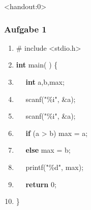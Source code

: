 \documentclass[aspectratio=1610,onlymath, ngerman]{beamer}
\renewcommand{\emph}[1]{\textbf{#1}}
\begin{document}
	\begin{frame}<handout:0> \frametitle{Aufgabe 1}
	\small
		\begin{minipage}{\dimexpr0.5\linewidth-\fboxrule-\fboxsep}
			\begin{ttfamily}
				\begin{enumerate}[label=\arabic* $\enskip$, nolistsep]
					\item \#\!\!\! include <stdio.h>
					\item \emph{int} main( ) \{
					\item $\quad$ \emph{int} a,b,max;
					\item $\quad$ scanf("\%i", \&a);
					\item $\quad$ scanf("\%i", \&a);
				\end{enumerate}
			\end{ttfamily}
		\end{minipage}
		\begin{minipage}{\dimexpr0.5\linewidth-\fboxrule-\fboxsep}
			\begin{ttfamily}
				\begin{enumerate}[label=\arabic* $\enskip$, nolistsep]
					\setcounter{enumi}{5}
					\item $\quad$ \emph{if} (a > b) max = a;
					\item $\quad$ \emph{else} max = b;
					\item $\quad$ printf("\%d", max);
					\item $\quad$ \emph{return} 0;
					\item \}
				\end{enumerate}
			\end{ttfamily}
		\end{minipage}
	\end{frame}
    
\end{document}
